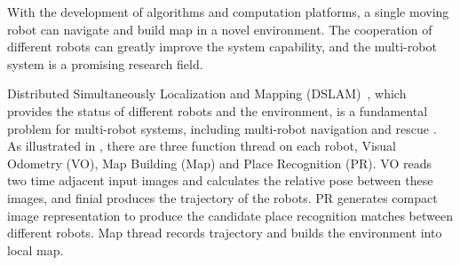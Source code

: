 \label{sec:intro}

With the development of algorithms and computation platforms, a single moving robot can navigate and build map in a novel environment. The cooperation of different robots can greatly improve the system capability, and the multi-robot system is a promising research field.

Distributed Simultaneously Localization and Mapping (DSLAM)~\cite{corah2019communication, cieslewski2018data}, which provides the status of different robots and the environment, is a fundamental problem for multi-robot systems, including multi-robot navigation \cite{tanner2005towards} and rescue \cite{baxter2007multi}. As illustrated in , there are three function thread on each robot, Visual Odometry (VO), Map Building (Map) and Place Recognition (PR). VO reads two time adjacent input images and calculates the relative pose between these images, and finial produces the trajectory of the robots. PR generates compact image representation to produce the candidate place recognition matches between different robots. Map thread records trajectory and builds the environment into local map.

